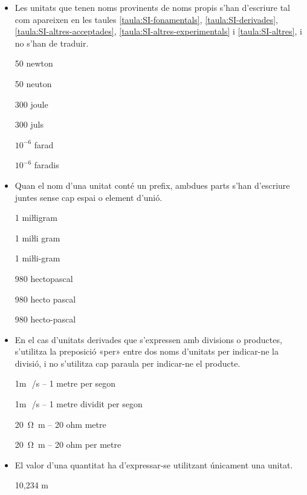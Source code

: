 \begin{itemize}
\item Les unitats que tenen noms provinents de noms propis s'han
d'escriure tal com apareixen en les taules
\vref{taula:SI-fonamentals}, \vref{taula:SI-derivades}, \vref{taula:SI-altres-acceptades}, \vref{taula:SI-altres-experimentals} i \vref{taula:SI-altres}, i no s'han
de traduir.

\textcolor{Green}\faCheckSquare{} 50 newton

\textcolor{Red}\faTimesCircle{}  50 neuton

\textcolor{Green}\faCheckSquare{} 300 joule

\textcolor{Red}\faTimesCircle{}  300 juls

\textcolor{Green}\faCheckSquare{} $10^{-6}$ farad

\textcolor{Red}\faTimesCircle{}  $10^{-6}$ faradis


 \item Quan el nom d'una unitat
conté un prefix, ambdues parts s'han d'escriure juntes sense cap espai o element d'unió.

\textcolor{Green}\faCheckSquare{} 1 miŀligram

\textcolor{Red}\faTimesCircle{} 1 miŀli gram

\textcolor{Red}\faTimesCircle{} 1 miŀli-gram

\textcolor{Green}\faCheckSquare{}  980 hectopascal

\textcolor{Red}\faTimesCircle{} 980 hecto pascal

\textcolor{Red}\faTimesCircle{} 980 hecto-pascal


\item En el cas  d'unitats derivades que s'expressen amb divisions o
productes, s'utilitza la preposició «per» entre dos noms d'unitats
per indicar-ne la divisió, i no s'utilitza cap paraula per indicar-ne el
producte.

\textcolor{Green}\faCheckSquare{} 1\unit{m\,/s} -- 1 metre per segon

\textcolor{Red}\faTimesCircle{}  1\unit{m\,/s} -- 1 metre dividit per segon

 \textcolor{Green}\faCheckSquare{} \SI{20}{\ohm.m} -- 20 ohm metre

\textcolor{Red}\faTimesCircle{}   \SI{20}{\ohm.m} -- 20 ohm  per metre


\item El valor d'una quantitat ha d'expressar-se  utilitzant únicament una
unitat.

\textcolor{Green}\faCheckSquare{} 10,234 m


\end{itemize}
